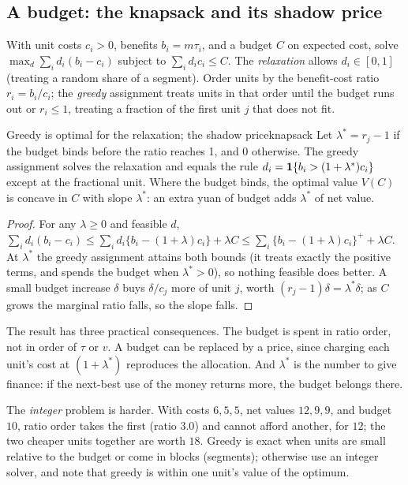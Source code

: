 \documentclass[11pt]{article}
\begin{document}
\subsection{A budget: the knapsack and its shadow price}

With unit costs $c_i > 0$, benefits $b_i = m\tau_i$, and a budget $C$ on expected cost, solve
$\max_d \sum_i d_i(b_i - c_i)$ subject to $\sum_i d_ic_i \le C$. The \emph{relaxation} allows $d_i \in [0,1]$ (treating a random
share of a segment). Order units by the benefit-cost ratio $r_i = b_i/c_i$; the \emph{greedy} assignment treats units in
that order until the budget runs out or $r_i \le 1$, treating a fraction of the first unit $j$ that does not fit.

\begin{prop}{Greedy is optimal for the relaxation; the shadow price}{knapsack}
Let $\lambda^\ast = r_j - 1$ if the budget binds before the ratio reaches 1, and $0$ otherwise. The greedy assignment solves
the relaxation and equals the rule $d_i = \mathbf{1}\{b_i > (1 + \lambda^\ast)c_i\}$ except at the fractional unit. Where the budget
binds, the optimal value $V(C)$ is concave in $C$ with slope $\lambda^\ast$: an extra yuan of budget adds $\lambda^\ast$ of net
value.
\end{prop}
\begin{proof}
For any $\lambda \ge 0$ and feasible $d$,
$\sum_i d_i(b_i - c_i) \le \sum_i d_i\{b_i - (1+\lambda)c_i\} + \lambda C \le \sum_i\{b_i - (1+\lambda)c_i\}^+ + \lambda C$. At
$\lambda^\ast$ the greedy assignment attains both bounds (it treats exactly the positive terms, and spends the budget when
$\lambda^\ast > 0$), so nothing feasible does better. A small budget increase $\delta$ buys $\delta/c_j$ more of unit $j$, worth
$(r_j - 1)\delta = \lambda^\ast\delta$; as $C$ grows the marginal ratio falls, so the slope falls.
\end{proof}

The result has three practical consequences. The budget is spent in ratio order, not in order of $\tau$ or $v$. A
budget can be replaced by a price, since charging each unit's cost at $(1 + \lambda^\ast)$ reproduces the allocation. And
$\lambda^\ast$ is the number to give finance: if the next-best use of the money returns more, the budget belongs there.

The \emph{integer} problem is harder. With costs $6, 5, 5$, net values $12, 9, 9$, and budget $10$, ratio order takes the first (ratio $3.0$) and cannot afford
another, for $12$; the two cheaper units together are worth $18$. Greedy is exact when units are small relative to the
budget or come in blocks (segments); otherwise use an integer solver, and note that greedy is within one unit's value of
the optimum.
\end{document}
